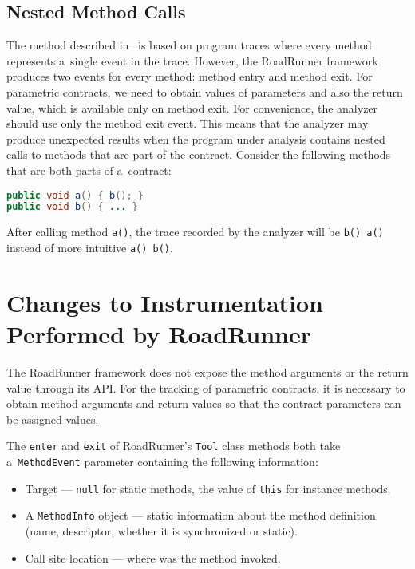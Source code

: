\subsection{Nested Method Calls}

The method described in~\cite{contracts} is based on program traces where
every method represents a~single event in the trace. However, the RoadRunner
framework produces two events for every method: method entry and method exit.
For parametric contracts, we need to obtain values of parameters and also the
return value, which is available only on method exit. For convenience, the
analyzer should use only the method exit event. This means that the analyzer may
produce unexpected results when the program under analysis contains nested calls
to methods that are part of the contract. Consider the following methods that
are both parts of a~contract:

\begin{lstlisting}[language=java]
public void a() { b(); }
public void b() { ... }
\end{lstlisting}

After calling method \texttt{a()}, the trace recorded by the analyzer will be
\texttt{b() a()} instead of more intuitive \texttt{a() b()}.

\section{Changes to Instrumentation Performed by RoadRunner}
\label{instrChanges}

The RoadRunner framework does not expose the method arguments or the return
value through its API. For the tracking of parametric contracts, it is necessary
to obtain method arguments and return values so that the contract parameters
can be assigned values.

The \texttt{enter} and \texttt{exit} of RoadRunner's \texttt{Tool} class methods
both take a~\texttt{MethodEvent} parameter containing the following information:
\begin{itemize}
    \item Target --- \texttt{null} for static methods, the value of \texttt{this}
        for instance methods.
    \item A \texttt{MethodInfo} object --- static information about the method
        definition (name, descriptor, whether it is synchronized or static).
    \item Call site location --- where was the method invoked.
\end{itemize}

